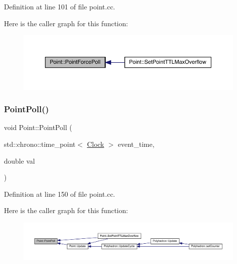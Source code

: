 Definition at line 101 of file point.\+cc.

Here is the caller graph for this function\+:
\nopagebreak
\begin{figure}[H]
\begin{center}
\leavevmode
\includegraphics[width=350pt]{class_point_a414f2215f758cd69fa67e8135ecc4fe2_icgraph}
\end{center}
\end{figure}
\mbox{\label{class_point_a026fcbc22b4667e74fea48a9dc6eeb61}} 
\subsubsection{\texorpdfstring{Point\+Poll()}{PointPoll()}}
{\footnotesize\ttfamily void Point\+::\+Point\+Poll (\begin{DoxyParamCaption}\item[{std\+::chrono\+::time\+\_\+point$<$ \hyperlink{universe_8h_a0ef8d951d1ca5ab3cfaf7ab4c7a6fd80}{Clock} $>$}]{event\+\_\+time,  }\item[{double}]{val }\end{DoxyParamCaption})}



Definition at line 150 of file point.\+cc.

Here is the caller graph for this function\+:
\nopagebreak
\begin{figure}[H]
\begin{center}
\leavevmode
\includegraphics[width=350pt]{class_point_a026fcbc22b4667e74fea48a9dc6eeb61_icgraph}
\end{center}
\end{figure}
\mbox{\label{class_point_a123c78bef71f74d71bc833709a38709c}} 
